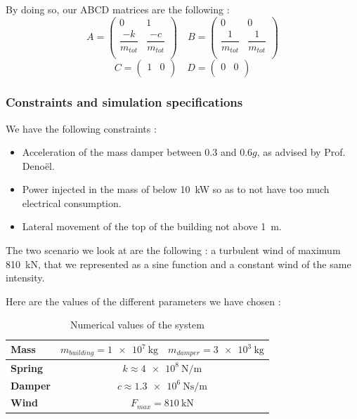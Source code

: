 By doing so, our ABCD matrices are the following :
$$
A = \begin{pmatrix}
    0 & 1\\
    \dfrac{-k}{m_{tot}} & \dfrac{-c}{m_{tot}}\\
\end{pmatrix}
\quad
B = \begin{pmatrix}
    0 & 0\\
    \dfrac{1}{m_{tot}} & \dfrac{1}{m_{tot}}\\
\end{pmatrix}
$$
$$
C = \begin{pmatrix}
    1 & 0\\
\end{pmatrix}
\quad
D = \begin{pmatrix}
    0 & 0\\
\end{pmatrix}
$$

\subsubsection{Constraints and simulation specifications}
We have the following constraints : 
\begin{itemize}
    \item Acceleration of the mass damper between \num{0.3} and \num{0.6}$g$, as advised by Prof. Denoël.
    \item Power injected in the mass of below \SI{10}{\kilo\watt} so as to not have too much electrical consumption.
    \item Lateral movement of the top of the building not above \SI{1}{\meter}.
\end{itemize}
The two scenario we look at are the following : a turbulent wind of maximum \SI{810}{\kilo\newton}, that we represented as a sine function and a constant wind of the same intensity.\par
Here are the values of the different parameters we have chosen : 
\begin{table}[H]
    \centering
    \begin{tabular}{|l|c|c|}
        \hline
        {\bf Mass} & $m_{building} = \SI{1e7}{\kilogram}$ & $m_{damper} = \SI{3e3}{\kilogram}$\\ \hline
        {\bf Spring} & \multicolumn{2}{c|}{$k\approx\SI{4e8}{\newton\per\meter}$}\\ \hline
        {\bf Damper} & \multicolumn{2}{c|}{$c\approx\SI{1.3e6}{\newton\second\per\meter}$}\\ \hline
        {\bf Wind} & \multicolumn{2}{c|}{$F_{max} = \SI{810}{\kilo\newton}$}\\ \hline
    \end{tabular}
    \caption{Numerical values of the system}
    \label{tab:numerical-values}
\end{table}


